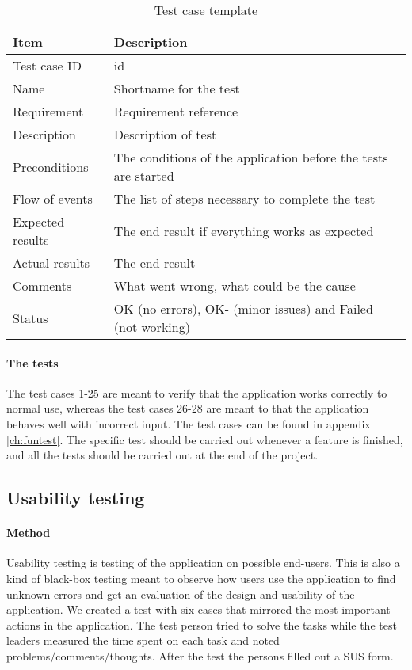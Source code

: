 \begin{table}[h!]
\begin{center}
\begin{tabular}{l|p{10cm}}\hline
\textbf{Item} & \textbf{Description} \\ \hline \hline
Test case ID & id \\ \hline
Name & Shortname for the test\\ \hline
Requirement & Requirement reference\\ \hline
Description & Description of test\\ \hline
Preconditions & The conditions of the application before the tests are started\\ \hline
Flow of events & The list of steps necessary to complete the test \\ \hline
Expected results & The end result if everything works as expected\\ \hline 
Actual results & The end result\\ \hline
Comments & What went wrong, what could be the cause\\ \hline
Status &OK (no errors), OK- (minor issues) and Failed (not working)\\ \hline
\end{tabular}
\end{center}
\caption{Test case template} \label{tab:casetemp1}
\end{table}
\paragraph{The tests}\hfill
\newline

The test cases 1-25 are meant to verify that the application works correctly to normal use, whereas the test cases 26-28 are meant to that the application behaves well with incorrect input. The test cases can be found in appendix \ref{ch:funtest}. The specific test should be carried out whenever a feature is finished, and all the tests should be carried out at the end of the project.
			
\subsection{Usability testing}\label{subsec:usabilitytesting}
\paragraph{Method}\hfill
\newline
Usability testing is testing of the application on possible end-users. This is also a kind of black-box testing meant to observe how users use the application to find unknown errors and get an evaluation of the design and usability of the application. We created a test with six cases that mirrored the most important actions in the application. The test person tried to solve the tasks while the test leaders measured the time spent on each task and noted problems/comments/thoughts. After the test the persons filled out a SUS form.


